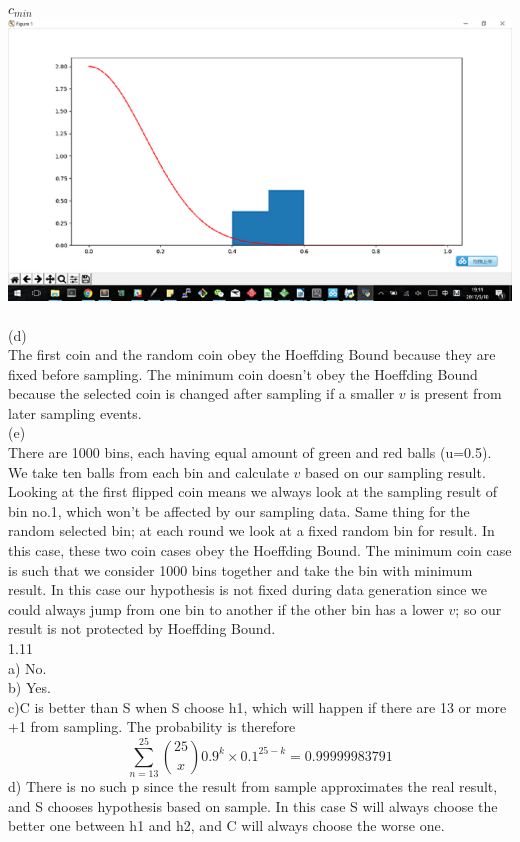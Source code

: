 \documentclass[12pt]{article}
\begin{document}
$c_{min}$\\
\includegraphics[scale=0.6]{c_min_C}\\\\
(d)\\%
The first coin and the random coin obey the Hoeffding Bound because they are fixed before sampling. The minimum coin doesn't obey the Hoeffding Bound because the selected coin is changed after sampling if a smaller $v$ is present from later sampling events.\\
(e)\\%
There are 1000 bins, each having equal amount of green and red balls (u=0.5). We take ten balls from each bin and calculate $v$ based on our sampling result. Looking at the first flipped coin means we always look at the sampling result of bin no.1, which won't be affected by our sampling data. Same thing for the random selected bin; at each round we look at a fixed random bin for result. In this case, these two coin cases obey the Hoeffding Bound. The minimum coin case is such that we consider 1000 bins together and take the bin with minimum result. In this case our hypothesis is not fixed during data generation since we could always jump from one bin to another if the other bin has a lower $v$; so our result is not protected by Hoeffding Bound.\\

1.11\\
a) No.\\%
b) Yes.\\%
c)C is better than S when S choose h1, which will happen if there are 13 or more +1 from sampling. The probability is therefore$$\sum_{n=13}^{25}{25 \choose x} 0.9^k\times 0.1^{25-k} = 0.99999983791$$
d) There is no such p since the result from sample approximates the real result, and S chooses hypothesis based on sample. In this case S will always choose the better one between h1 and h2, and C will always choose the worse one. 
\end{document}
